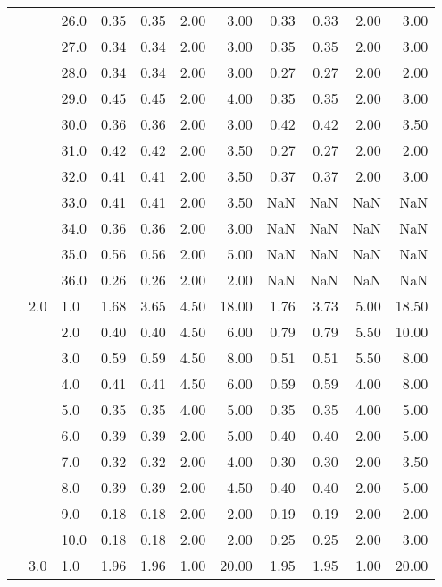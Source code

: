 \begin{tabular}{lllrrrrrrrr}
   &     & 26.0 &       0.35 &      0.35 & 2.00 &   3.00 &       0.33 &      0.33 & 2.00 &   3.00 \\
   &     & 27.0 &       0.34 &      0.34 & 2.00 &   3.00 &       0.35 &      0.35 & 2.00 &   3.00 \\
   &     & 28.0 &       0.34 &      0.34 & 2.00 &   3.00 &       0.27 &      0.27 & 2.00 &   2.00 \\
   &     & 29.0 &       0.45 &      0.45 & 2.00 &   4.00 &       0.35 &      0.35 & 2.00 &   3.00 \\
   &     & 30.0 &       0.36 &      0.36 & 2.00 &   3.00 &       0.42 &      0.42 & 2.00 &   3.50 \\
   &     & 31.0 &       0.42 &      0.42 & 2.00 &   3.50 &       0.27 &      0.27 & 2.00 &   2.00 \\
   &     & 32.0 &       0.41 &      0.41 & 2.00 &   3.50 &       0.37 &      0.37 & 2.00 &   3.00 \\
   &     & 33.0 &       0.41 &      0.41 & 2.00 &   3.50 &        NaN &       NaN &  NaN &    NaN \\
   &     & 34.0 &       0.36 &      0.36 & 2.00 &   3.00 &        NaN &       NaN &  NaN &    NaN \\
   &     & 35.0 &       0.56 &      0.56 & 2.00 &   5.00 &        NaN &       NaN &  NaN &    NaN \\
   &     & 36.0 &       0.26 &      0.26 & 2.00 &   2.00 &        NaN &       NaN &  NaN &    NaN \\
   & 2.0 & 1.0  &       1.68 &      3.65 & 4.50 &  18.00 &       1.76 &      3.73 & 5.00 &  18.50 \\
   &     & 2.0  &       0.40 &      0.40 & 4.50 &   6.00 &       0.79 &      0.79 & 5.50 &  10.00 \\
   &     & 3.0  &       0.59 &      0.59 & 4.50 &   8.00 &       0.51 &      0.51 & 5.50 &   8.00 \\
   &     & 4.0  &       0.41 &      0.41 & 4.50 &   6.00 &       0.59 &      0.59 & 4.00 &   8.00 \\
   &     & 5.0  &       0.35 &      0.35 & 4.00 &   5.00 &       0.35 &      0.35 & 4.00 &   5.00 \\
   &     & 6.0  &       0.39 &      0.39 & 2.00 &   5.00 &       0.40 &      0.40 & 2.00 &   5.00 \\
   &     & 7.0  &       0.32 &      0.32 & 2.00 &   4.00 &       0.30 &      0.30 & 2.00 &   3.50 \\
   &     & 8.0  &       0.39 &      0.39 & 2.00 &   4.50 &       0.40 &      0.40 & 2.00 &   5.00 \\
   &     & 9.0  &       0.18 &      0.18 & 2.00 &   2.00 &       0.19 &      0.19 & 2.00 &   2.00 \\
   &     & 10.0 &       0.18 &      0.18 & 2.00 &   2.00 &       0.25 &      0.25 & 2.00 &   3.00 \\
   & 3.0 & 1.0  &       1.96 &      1.96 & 1.00 &  20.00 &       1.95 &      1.95 & 1.00 &  20.00 \\
\bottomrule
\end{tabular}
